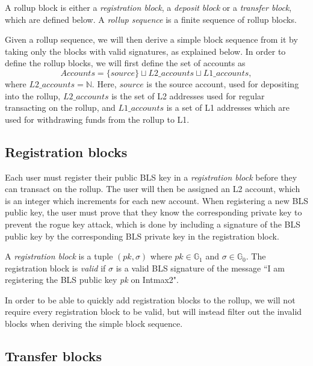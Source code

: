 \begin{defn}
  A rollup block is either a \emph{registration block}, a \emph{deposit block} or a \emph{transfer block}, which are defined below. A \emph{rollup sequence} is a finite sequence of rollup blocks.
\end{defn}

Given a rollup sequence, we will then derive a simple block sequence from it by taking only the blocks with valid signatures, as explained below. In order to define the rollup blocks, we will first define the set of accounts as \[Accounts = \{source\} \sqcup L2\_accounts \sqcup L1\_accounts,\] where \(L2\_accounts = \mathbb{N}\). Here, \(source\) is the source account, used for depositing into the rollup, \(L2\_accounts\) is the set of L2 addresses used for regular transacting on the rollup, and \(L1\_accounts\) is a set of L1 addresses which are used for withdrawing funds from the rollup to L1.

\subsection{Registration blocks}

Each user must register their public BLS key in a \emph{registration block} before they can transact on the rollup. The user will then be assigned an L2 account, which is an integer which increments for each new account. When registering a new BLS public key, the user must prove that they know the corresponding private key to prevent the rogue key attack, which is done by including a signature of the BLS public key by the corresponding BLS private key in the registration block.

\begin{defn}
A \emph{registration block} is a tuple \((pk, \sigma)\) where \(pk \in \mathbb{G}_1\) and \(\sigma \in \mathbb{G}_0\). The registration block is \emph{valid} if \(\sigma\) is a valid BLS signature of the message ``I am registering the BLS public key \emph{pk} on Intmax2".
\end{defn}

In order to be able to quickly add registration blocks to the rollup, we will not require every registration block to be valid, but will instead filter out the invalid blocks when deriving the simple block sequence.



\subsection{Transfer blocks}

